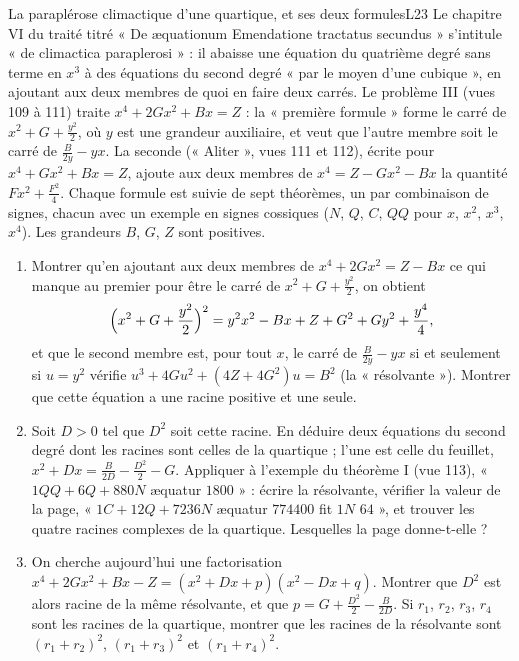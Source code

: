 \documentclass[11pt,a4paper]{article}
\begin{document}
\begin{exercice}{La paraplérose climactique d'une quartique, et ses deux formules}{L2}{3}
Le chapitre VI du traité titré « De æquationum Emendatione tractatus secundus »
s'intitule « de climactica paraplerosi » : il abaisse une équation du quatrième
degré sans terme en $x^3$ à des équations du second degré « par le moyen d'une
cubique », en ajoutant aux deux membres de quoi en faire deux carrés. Le problème
III (vues 109 à 111) traite $x^4 + 2Gx^2 + Bx = Z$ : la « première formule »
forme le carré de $x^2 + G + \frac{y^2}{2}$, où $y$ est une grandeur auxiliaire, et
veut que l'autre membre soit le carré de $\frac{B}{2y} - yx$. La seconde
(« Aliter », vues 111 et 112), écrite pour $x^4 + Gx^2 + Bx = Z$, ajoute aux deux
membres de $x^4 = Z - Gx^2 - Bx$ la quantité $Fx^2 + \frac{F^2}{4}$. Chaque formule
est suivie de sept théorèmes, un par combinaison de signes, chacun avec un exemple
en signes cossiques ($N$, $Q$, $C$, $QQ$ pour $x$, $x^2$, $x^3$, $x^4$). Les
grandeurs $B$, $G$, $Z$ sont positives.
\begin{enumerate}
\item Montrer qu'en ajoutant aux deux membres de $x^4 + 2Gx^2 = Z - Bx$ ce qui
  manque au premier pour être le carré de $x^2 + G + \frac{y^2}{2}$, on obtient
  \[
  \Bigl(x^2 + G + \frac{y^2}{2}\Bigr)^2 = y^2x^2 - Bx + Z + G^2 + Gy^2 + \frac{y^4}{4} ,
  \]
  et que le second membre est, pour tout $x$, le carré de $\frac{B}{2y} - yx$ si et
  seulement si $u = y^2$ vérifie
  $u^3 + 4Gu^2 + (4Z + 4G^2)u = B^2$ (la « résolvante »). Montrer que cette
  équation a une racine positive et une seule.
\item Soit $D > 0$ tel que $D^2$ soit cette racine. En déduire deux équations du
  second degré dont les racines sont celles de la quartique ; l'une est celle du
  feuillet, $x^2 + Dx = \frac{B}{2D} - \frac{D^2}{2} - G$. Appliquer à l'exemple du
  théorème I (vue 113), « $1QQ + 6Q + 880N$ æquatur $1800$ » : écrire la
  résolvante, vérifier la valeur de la page, « $1C + 12Q + 7236N$ æquatur $774400$
  fit $1N$ $64$ », et trouver les quatre racines complexes de la quartique.
  Lesquelles la page donne-t-elle ?
\item On cherche aujourd'hui une factorisation
  $x^4 + 2Gx^2 + Bx - Z = (x^2 + Dx + p)(x^2 - Dx + q)$. Montrer que $D^2$ est
  alors racine de la même résolvante, et que $p = G + \frac{D^2}{2} - \frac{B}{2D}$.
  Si $r_1$, $r_2$, $r_3$, $r_4$ sont les racines de la quartique, montrer que les
  racines de la résolvante sont $(r_1 + r_2)^2$, $(r_1 + r_3)^2$ et $(r_1 + r_4)^2$.

\end{enumerate}
\end{exercice}
\end{document}
